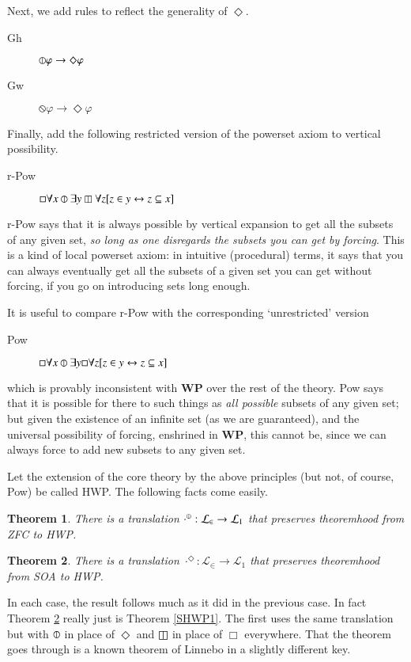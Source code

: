 \documentclass{article}
\newtheorem{theorem}{Theorem}
\begin{document}
Next, we add rules to reflect the generality of $\Diamond$.
\begin{description}
    \item[Gh] $\circledbar \varphi \rightarrow \Diamond \varphi$
    \item[Gw] $\circledbslash \varphi \rightarrow \Diamond \varphi$
\end{description}
Finally, add the following restricted version of the 
powerset axiom to vertical possibility.
\begin{description}
    \item[r-Pow] $\Box \forall x \circledbar \exists y \boxbar \forall z[ z \in y \leftrightarrow z \subseteq x]$
\end{description}
r-Pow says that it is always possible by vertical expansion to get all the subsets of 
any given set, \emph{so long as one disregards the subsets you can get by forcing}. 
This is a kind of local powerset axiom: in intuitive (procedural) terms,
it says that you can always eventually get 
all the subsets of a given set you can get without forcing, if you go on introducing 
sets long enough.

It is useful to compare r-Pow with the corresponding `unrestricted' version 
\begin{description}
    \item[Pow] $\Box \forall x \circledbar \exists y \Box \forall z[ z \in y \leftrightarrow z \subseteq x]$
\end{description}
which is provably inconsistent with {\bf WP} over the rest of the theory. Pow says that 
it is possible for there to such things as \emph{all possible} subsets of any given 
set; but given the existence of an infinite set (as we are guaranteed), and the 
universal possibility of forcing, enshrined in {\bf WP}, this cannot be, since we can always force 
to add new subsets to any given set.

Let the extension of the core theory by the above principles (but not, of course, Pow)
be called HWP. The following facts come easily.
\begin{theorem}\label{HWP0}
    There is a translation $\cdot^\circledbar : \mathcal{L}_\in \to \mathcal{L}_1$
    that preserves theoremhood from ZFC to HWP.
\end{theorem}
\begin{theorem}\label{HWP1}
    There is a translation $\cdot^\Diamond : \mathcal{L}_\in \to \mathcal{L}_1$
    that preserves theoremhood from SOA to HWP.
\end{theorem}
In each case, the result follows much as it did in the previous case. In fact 
Theorem \ref{HWP1} really just is Theorem \ref{SHWP1}. The first uses the same translation
but with $\circledbar$ in place of $\Diamond$ and $\boxbar$ in place of $\Box$ 
everywhere. That the theorem goes through is a known theorem of Linnebo in a slightly 
different key.
\end{document}
